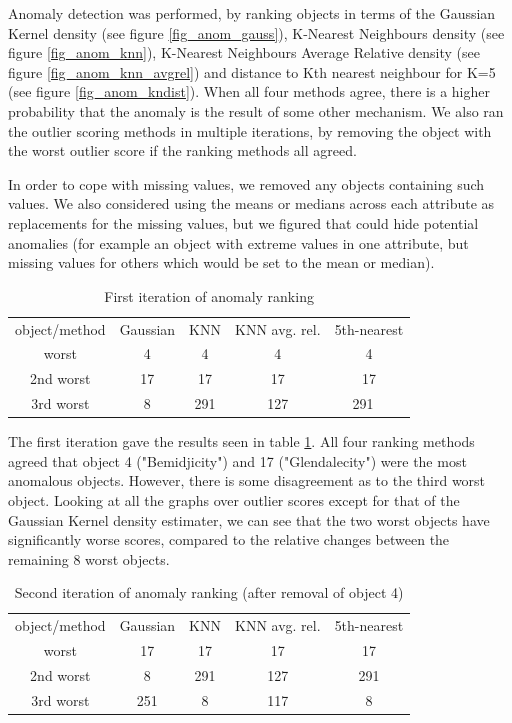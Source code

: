 \documentclass[a4paper,10pt]{article}
\begin{document}
Anomaly detection was performed, by ranking objects in terms of the Gaussian Kernel density (see figure \ref{fig_anom_gauss}), K-Nearest Neighbours density (see figure \ref{fig_anom_knn}), K-Nearest Neighbours Average Relative density (see figure \ref{fig_anom_knn_avgrel}) and distance to Kth nearest neighbour for K=5 (see figure \ref{fig_anom_kndist}). When all four methods agree, there is a higher probability that the anomaly is the result of some other mechanism. We also ran the outlier scoring methods in multiple iterations, by removing the object with the worst outlier score if the ranking methods all agreed.

In order to cope with missing values, we removed any objects containing such values. We also considered using the means or medians across each attribute as replacements for the missing values, but we figured that could hide potential anomalies (for example an object with extreme values in one attribute, but missing values for others which would be set to the mean or median). 

\begin{table}[H]
\begin{tabular}{c | c c c c}
  object/method & Gaussian & KNN & KNN avg. rel. & 5th-nearest \\
  worst & 4 & 4 & 4 & 4 \\
  2nd worst & 17 & 17 & 17 & 17 \\
  3rd worst & 8 & 291 & 127 & 291 \
\end{tabular}
\caption{First iteration of anomaly ranking}
\label{table_ite1}
\end{table}

The first iteration gave the results seen in table \ref{table_ite1}. All four ranking methods agreed that object 4 ("Bemidjicity") and 17 ("Glendalecity") were the most anomalous objects. However, there is some disagreement as to the third worst object. Looking at all the graphs over outlier scores except for that of the Gaussian Kernel density estimater, we can see that the two worst objects have significantly worse scores, compared to the relative changes between the remaining 8 worst objects.

\begin{table}[H]
\begin{tabular}{c | c c c c}
  object/method
        & Gaussian
                & KNN
                        & KNN avg. rel.
                          & 5th-nearest \\
  worst     & 17  & 17  & 17  & 17   \\
  2nd worst & 8   & 291 & 127 & 291  \\
  3rd worst & 251 & 8   & 117 & 8
\end{tabular}
\caption{Second iteration of anomaly ranking (after removal of object 4)}
\label{table_ite2}
\end{table}
\end{document}
